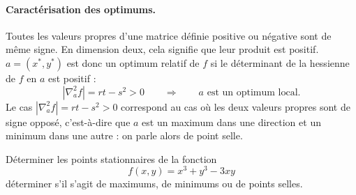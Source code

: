 \paragraph{Caractérisation des optimums.}
Toutes les valeurs propres d'une matrice définie positive ou négative sont de même signe. 
En dimension deux, cela signifie que leur produit est positif.
$a = (x^*, y^*)$ est donc un optimum relatif de $f$ si le déterminant de la hessienne de $f$ en $a$ est positif : 
$$
|\nabla^2_a f| = rt - s^2 > 0
\qquad \Rightarrow \qquad
\text{$a$ est un optimum local} .
$$
Le cas $|\nabla^2_a f| = rt - s^2 > 0$ correspond au cas où les deux valeurs propres sont de signe opposé, c'est-à-dire que $a$ est un maximum dans une direction et un minimum dans une autre : on parle alors de point selle.


\begin{exercise*}
  Déterminer les points stationnaires de la fonction 
  $$
  f(x, y) = x^3 + y^3 - 3 xy
  $$
  déterminer s'il s'agit de maximums, de minimums ou de points selles.
\end{exercise*}

